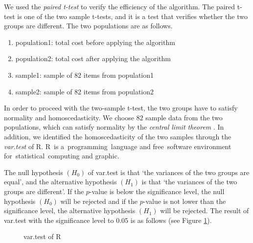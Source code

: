 \documentclass[a4paper]{amsart}
\numberwithin{equation}{section} %
\numberwithin{figure}{section} %
\numberwithin{table}{section}
\theoremstyle{plain}
\theoremstyle{definition}
\theoremstyle{plain}
\theoremstyle{plain}
\theoremstyle{plain}
\theoremstyle{plain}
\theoremstyle{plain}
\begin{document}
We used the {\it paired t-test}\cite{Rice} to verify the efficiency of the algorithm. 
The paired t-test is one of the two sample t-tests, and it is a test that verifies whether the two groups are different. The two populations are as follows.

\begin{enumerate}[$\bullet$]
	\item population1: total cost before applying the algorithm
	\item population2: total cost after applying the algorithm
	\item sample1: sample of 82 items from population1
	\item sample2: sample of 82 items from population2
\end{enumerate}

In order to proceed with the two-sample t-test, the two groups have to satisfy normality and homoscedasticity. We choose $82$ sample data from the two populations, which can satisfy normality by the {\it central limit theorem} \cite{Durrett}.
In addition, we identified the homoscedasticity of the two samples through the {\it var.test} of R. 
R is a programming language and free software environment for statistical computing and graphic. %



The null hypothesis $(H_{0})$ of var.test is that `the variances of the two groups are equal', and the alternative hypothesis $(H_{1})$ is that `the variances of the two groups are different'. 
If the $p$-value is below the significance level, the null hypothesis $(H_{0})$ will be rejected and if the $p$-value is not lower than the significance level, the alternative hypothesis $(H_{1})$ will be rejected.  The result of var.test with the significance level to 0.05 is as follows (see Figure \ref{fig:vartest}).

\begin{figure}[h!]
	\centering
	\caption{var.test of R}
	\label{fig:vartest}       %
\end{figure}
\end{document}
